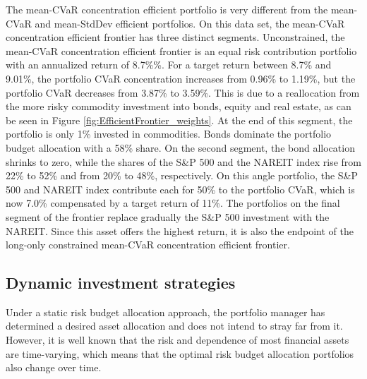 \documentclass[12pt,a4paper]{article}
\begin{document}
The mean-CVaR concentration efficient portfolio is very different from the mean-CVaR and mean-StdDev efficient portfolios. On this data set, the mean-CVaR concentration efficient frontier has three distinct segments. Unconstrained, the mean-CVaR concentration efficient frontier is an equal risk contribution portfolio with an annualized return of 8.7\%\%. For a target return between 8.7\% and 9.01\%, the portfolio CVaR concentration increases from 0.96\% to 1.19\%, but the portfolio CVaR decreases from 3.87\% to 3.59\%. This is due to a reallocation from the more risky commodity investment into bonds, equity and real estate, as can be seen in Figure \ref{fig:EfficientFrontier_weights}. At the end of this segment, the portfolio is only 1\% invested in commodities. Bonds dominate the portfolio budget allocation with a 58\% share. On the second segment, the bond allocation shrinks to zero, while the shares of the S\&P 500 and the NAREIT index rise from 22\% to 52\% and from 20\% to 48\%, respectively. On this angle portfolio, the S\&P 500 and NAREIT index contribute each for 50\% to the portfolio CVaR, which is now 7.0\% compensated by a target return of 11\%. The portfolios on the final segment of the frontier replace gradually the S\&P 500 investment with the NAREIT. Since this asset offers the highest return, it is also the endpoint of the long-only constrained mean-CVaR concentration efficient frontier.

\clearpage
\subsection{Dynamic investment strategies}\label{subsec:dynamic}

Under a static risk budget allocation approach, the portfolio manager has determined a desired asset allocation and does not intend
to stray far from it. However, it is well known that the risk and dependence of most financial assets are time-varying, which means that the optimal risk budget allocation portfolios also change over time.
\end{document}
